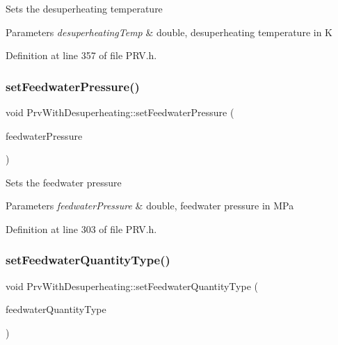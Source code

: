 Sets the desuperheating temperature


\begin{DoxyParams}{Parameters}
{\em desuperheating\+Temp} & double, desuperheating temperature in K \\
\hline
\end{DoxyParams}


Definition at line 357 of file P\+R\+V.\+h.

\mbox{\label{class_prv_with_desuperheating_a8494ebf87e5bd834f621b0c7ca257fbe}} 
\subsubsection{\texorpdfstring{set\+Feedwater\+Pressure()}{setFeedwaterPressure()}}
{\footnotesize\ttfamily void Prv\+With\+Desuperheating\+::set\+Feedwater\+Pressure (\begin{DoxyParamCaption}\item[{double}]{feedwater\+Pressure }\end{DoxyParamCaption})\hspace{0.3cm}{\ttfamily [inline]}}

Sets the feedwater pressure


\begin{DoxyParams}{Parameters}
{\em feedwater\+Pressure} & double, feedwater pressure in M\+Pa \\
\hline
\end{DoxyParams}


Definition at line 303 of file P\+R\+V.\+h.

\mbox{\label{class_prv_with_desuperheating_a3efaf028d1e6b8349a9e064605cc8d7a}} 
\subsubsection{\texorpdfstring{set\+Feedwater\+Quantity\+Type()}{setFeedwaterQuantityType()}}
{\footnotesize\ttfamily void Prv\+With\+Desuperheating\+::set\+Feedwater\+Quantity\+Type (\begin{DoxyParamCaption}\item[{\hyperlink{class_steam_properties_ae0294bedf7d178c2d8fb6aed0f62fbff}{Steam\+Properties\+::\+Thermodynamic\+Quantity}}]{feedwater\+Quantity\+Type }\end{DoxyParamCaption})\hspace{0.3cm}{\ttfamily [inline]}}

